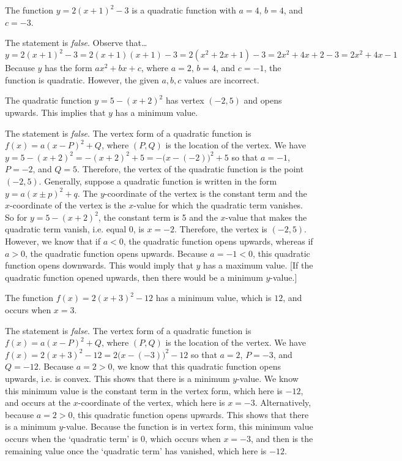 \documentclass[11pt,letterpaper]{article}
\begin{document}
\newpage



 The function $y= 2(x + 1)^2 - 3$ is a quadratic function with $a= 4$, $b= 4$, and $c= -3$. \pspace

\sol The statement is \textit{false}. Observe that\dots
	\[
	y= 2(x + 1)^2 - 3= 2(x + 1)(x + 1) - 3= 2(x^2 + 2x + 1) - 3= 2x^2 + 4x + 2 - 3= 2x^2 + 4x - 1
	\]
Because $y$ has the form $ax^2 + bx + c$, where $a= 2$, $b= 4$, and $c= -1$, the function is quadratic. However, the given $a, b, c$ values are incorrect. \pvspace{1.3cm}



 The quadratic function $y= 5 - (x + 2)^2$ has vertex $(-2, 5)$ and opens upwards. This implies that $y$ has a minimum value. \pspace

\sol The statement is \textit{false}. The vertex form of a quadratic function is $f(x)= a(x - P)^2 + Q$, where $(P, Q)$ is the location of the vertex. We have $y= 5 - (x + 2)^2= -(x + 2)^2 + 5= -\big(x - (-2) \big)^2 + 5$ so that $a= -1$, $P= -2$, and $Q= 5$. Therefore, the vertex of the quadratic function is the point $(-2, 5)$. Generally, suppose a quadratic function is written in the form $y= a(x \pm p)^2 + q$. The $y$-coordinate of the vertex is the constant term and the $x$-coordinate of the vertex is the $x$-value for which the quadratic term vanishes. So for $y= 5 - (x + 2)^2$, the constant term is 5 and the $x$-value that makes the quadratic term vanish, i.e. equal 0, is $x= -2$. Therefore, the vertex is $(-2, 5)$. However, we know that if $a < 0$, the quadratic function opens upwards, whereas if $a > 0$, the quadratic function opens upwards. Because $a= -1 < 0$, this quadratic function opens downwards. This would imply that $y$ has a maximum value. [If the quadratic function opened upwards, then there would be a minimum $y$-value.] \pvspace{1.3cm}



 The function $f(x)= 2(x + 3)^2 - 12$ has a minimum value, which is $12$, and occurs when $x= 3$. \pspace

\sol The statement is \textit{false}. The vertex form of a quadratic function is $f(x)= a(x - P)^2 + Q$, where $(P, Q)$ is the location of the vertex. We have $f(x)= 2(x + 3)^2 - 12= 2 \big(x - (-3) \big)^2 - 12$ so that $a= 2$, $P= -3$, and $Q= -12$. Because $a= 2 > 0$, we know that this quadratic function opens upwards, i.e. is convex. This shows that there is a minimum $y$-value. We know this minimum value is the constant term in the vertex form, which here is $-12$, and occurs at the $x$-coordinate of the vertex, which here is $x= -3$. Alternatively, because $a= 2 > 0$, this quadratic function opens upwards. This shows that there is a minimum $y$-value. Because the function is in vertex form, this minimum value occurs when the `quadratic term' is 0, which occurs when $x= -3$, and then is the remaining value once the `quadratic term' has vanished, which here is $-12$. \pvspace{1.3cm}
\end{document}
